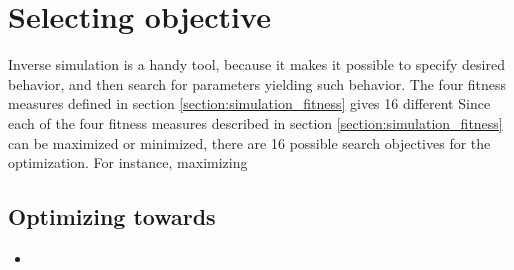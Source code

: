 \section{Selecting objective}
Inverse simulation is a handy tool, because it makes it possible to specify desired behavior, and then search for parameters yielding such behavior. The four fitness measures defined in section \ref{section:simulation_fitness} gives 16 different 
Since each of the four fitness measures described in section \ref{section:simulation_fitness} can be maximized or minimized, there are 16 possible search objectives for the optimization. For instance, maximizing 



\subsection{Optimizing towards }


\begin{itemize}
\item 
\end{itemize}


